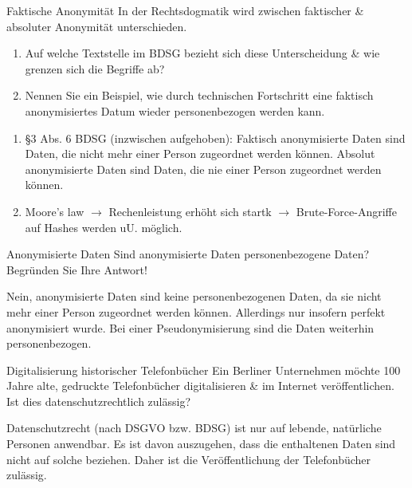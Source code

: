 \documentclass{article}
\begin{document}
\begin{exercise}{Faktische Anonymität}
  In der Rechtsdogmatik wird zwischen faktischer \& absoluter Anonymität unterschieden.
  \begin{enumerate}
    \item Auf welche Textstelle im BDSG bezieht sich diese Unterscheidung \& wie grenzen sich die Begriffe ab?
    \item Nennen Sie ein Beispiel, wie durch technischen Fortschritt eine faktisch anonymisiertes Datum wieder personenbezogen werden kann.
  \end{enumerate}

  \begin{solution}
    \begin{enumerate}
      \item §3 Abs. 6 BDSG (inzwischen aufgehoben): Faktisch anonymisierte Daten sind Daten, die nicht mehr einer Person zugeordnet werden können. Absolut anonymisierte Daten sind Daten, die nie einer Person zugeordnet werden können.
      \item Moore's law $\to$ Rechenleistung erhöht sich startk $\to$ Brute-Force-Angriffe auf Hashes werden uU. möglich.
    \end{enumerate}
  \end{solution}
\end{exercise}

\begin{exercise}{Anonymisierte Daten}
  Sind anonymisierte Daten personenbezogene Daten? Begründen Sie Ihre Antwort!

  \begin{solution}
    Nein, anonymisierte Daten sind keine personenbezogenen Daten, da sie nicht mehr einer Person zugeordnet werden können. Allerdings nur insofern perfekt anonymisiert wurde. Bei einer Pseudonymisierung sind die Daten weiterhin personenbezogen.
  \end{solution}
\end{exercise}

\begin{exercise}{Digitalisierung historischer Telefonbücher}
  Ein Berliner Unternehmen möchte 100 Jahre alte, gedruckte Telefonbücher digitalisieren \& im Internet veröffentlichen. Ist dies datenschutzrechtlich zulässig?

  \begin{solution}
    Datenschutzrecht (nach DSGVO bzw. BDSG) ist nur auf lebende, natürliche Personen anwendbar. Es ist davon auszugehen, dass die enthaltenen Daten sind nicht auf solche beziehen. Daher ist die Veröffentlichung der Telefonbücher zulässig.
  \end{solution}
\end{exercise}
\end{document}

